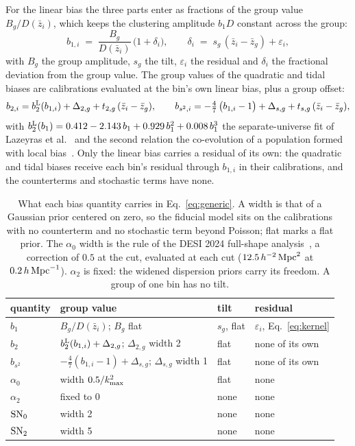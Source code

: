 \documentclass[11pt]{article}
\newcommand{\kmax}{k_{\rm max}}
\newcommand{\hMpc}{\,h\,{\rm Mpc}^{-1}}
\newcommand{\aunit}{\,h^{-2}\,{\rm Mpc}^2}
\newcommand{\bstwo}{b_{s^2}}
\newcommand{\SNz}{{\rm SN}_0}
\newcommand{\SNt}{{\rm SN}_2}
\newcommand{\wDtwo}{2}
\newcommand{\wDs}{1}
\newcommand{\wSNz}{2}
\newcommand{\wSNt}{5}
\newcommand{\ctFrac}{0.5}
\newcommand{\ctDESI}{12.5}
\begin{document}
For the linear bias the three parts enter as fractions of the group
value $B_g/D(\bar{z}_i)$, which keeps the clustering amplitude $b_1 D$
constant across the group:
\begin{equation}
  b_{1,i} \;=\; \frac{B_g}{D(\bar{z}_i)}\,\bigl(1 + \delta_i\bigr),
  \qquad
  \delta_i \;=\; s_g\,(\bar{z}_i - \bar{z}_g) + \varepsilon_i ,
  \label{eq:linear}
\end{equation}
with $B_g$ the group amplitude, $s_g$ the tilt, $\varepsilon_i$ the
residual and $\delta_i$ the fractional deviation from the group value.
The group values of the quadratic and tidal biases are calibrations
evaluated at the bin's own linear bias, plus a group offset:
\begin{equation}
  b_{2,i} = b_2^{\rm L}(b_{1,i}) + \Delta_{2,g}
    + t_{2,g}\,(\bar{z}_i - \bar{z}_g) ,
  \qquad
  b_{s^2,i} = -\tfrac{4}{7}\,\bigl(b_{1,i} - 1\bigr) + \Delta_{s,g}
    + t_{s,g}\,(\bar{z}_i - \bar{z}_g) ,
  \label{eq:calibrations}
\end{equation}
with $b_2^{\rm L}(b_1) = 0.412 - 2.143\,b_1 + 0.929\,b_1^2 +
0.008\,b_1^3$ the separate-universe fit of Lazeyras et
al.~\cite{Lazeyras2016} and the second relation the co-evolution of a
population formed with local bias~\cite{Saito2014}.  Only the linear
bias carries a residual of its own: the quadratic and tidal biases
receive each bin's residual through $b_{1,i}$ in their calibrations,
and the counterterms and stochastic terms have none.

\begin{table}[tbp]
  \centering
  \begin{tabular}{llll}
    \toprule
    quantity & group value & tilt & residual \\
    \midrule
    $b_1$ & $B_g/D(\bar{z}_i)$; $B_g$ flat & $s_g$, flat
      & $\varepsilon_i$, Eq.~\eqref{eq:kernel} \\
    $b_2$ & $b_2^{\rm L}(b_{1,i}) + \Delta_{2,g}$; $\Delta_{2,g}$ width
      \wDtwo{} & flat & none of its own \\
    $\bstwo$ & $-\tfrac{4}{7}(b_{1,i} - 1) + \Delta_{s,g}$;
      $\Delta_{s,g}$ width \wDs{} & flat & none of its own \\
    $\alpha_0$ & width $\ctFrac/\kmax^2$ & flat & none \\
    $\alpha_2$ & fixed to $0$ & none & none \\
    $\SNz$ & width \wSNz{} & none & none \\
    $\SNt$ & width \wSNt{} & none & none \\
    \bottomrule
  \end{tabular}
  \caption{What each bias quantity carries in Eq.~\eqref{eq:generic}.
    A width is that of a Gaussian prior centered on zero, so the
    fiducial model sits on the calibrations with no counterterm and no
    stochastic term beyond Poisson; flat marks a flat prior.  The
    $\alpha_0$ width is the rule of the DESI 2024 full-shape
    analysis~\cite{DESI2024V,Maus2024}, a correction of $\ctFrac$ at
    the cut, evaluated at each cut ($\ctDESI\aunit$ at $0.2\hMpc$).
    $\alpha_2$ is fixed: the widened dispersion priors carry its
    freedom.  A
    group of one bin has no tilt.}
  \label{tab:params}
\end{table}
\end{document}
